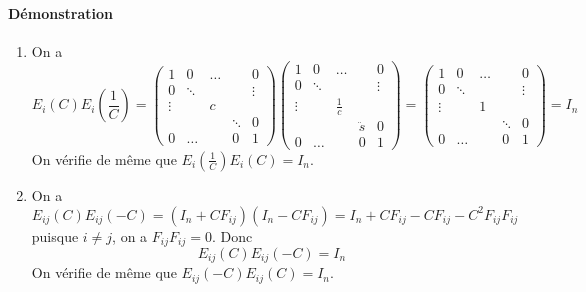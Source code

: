 \paragraph{Démonstration}
\begin{enumerate}
  \item On a
    $$E_i(C)E_i(\frac{1}{C}) = 
      \begin{pmatrix}
        1 & 0 & \dots & & 0 \\
        0 & \ddots & & & \vdots \\
        \vdots & & c \\
        & & & \ddots & 0 \\
        0 & \dots & & 0 & 1
      \end{pmatrix} 
      \begin{pmatrix}
        1 & 0 & \dots & & 0 \\
        0 & \ddots & & & \vdots \\
        \vdots & & \frac{1}{c} \\
        & & & \ddot s & 0 \\
        0 & \dots & & 0 & 1
      \end{pmatrix} = 
      \begin{pmatrix}
        1 & 0 & \dots & & 0 \\
        0 & \ddots & & & \vdots \\
        \vdots & & 1 \\
        & & & \ddots & 0 \\
       0 &\dots & & 0 & 1
      \end{pmatrix} = I_n$$
    On vérifie de même que $E_i(\frac{1}{C}) E_i(C) = I_n$.
  
  \item On a
    $$E_{i j}(C) E_{i j}(-C) = (I_n + C F_{i j}) (I_n - C F_{i j}) = I_n + C F_{i j} - C F_{i j} - C^2 F_{i j} F_{i j}$$
    puisque $i\neq j$, on a $F_{i j} F_{i j} = 0$. Donc
    $$E_{i j}(C) E_{i j}(-C) = I_n$$
    On vérifie de même que $E_{i j}(-C) E_{i j}(C) = I_n$.
  

\end{enumerate}
